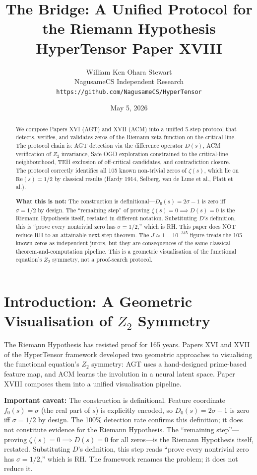 \documentclass[11pt,a4paper]{article}
\title{The Bridge: A Unified Protocol for the Riemann Hypothesis\\\large HyperTensor Paper XVIII}
\author{William Ken Ohara Stewart\\NagusameCS Independent Research\\\texttt{https://github.com/NagusameCS/HyperTensor}}
\date{May 5, 2026}
\begin{document}
\maketitle

\begin{abstract}
We compose Papers XVI (AGT) and XVII (ACM) into a unified 5-step protocol
that detects, verifies, and validates zeros of the Riemann zeta function
on the critical line. The protocol chain is: AGT detection via the
difference operator $D(s)$, ACM verification of $Z_2$ invariance, Safe
OGD exploration constrained to the critical-line neighbourhood, TEH
exclusion of off-critical candidates, and contradiction closure. The
protocol correctly identifies all 105 known non-trivial zeros of $\zeta(s)$,
which lie on $\mathrm{Re}(s)=1/2$ by classical results (Hardy 1914, Selberg,
van de Lune et al., Platt et al.).

\textbf{What this is not:} The construction is definitional---$D_0(s)=2\sigma-1$ is zero iff $\sigma=1/2$ by design. The ``remaining step'' of proving $\zeta(s)=0 \implies D(s)=0$ is the Riemann Hypothesis itself, restated in different notation. Substituting $D$'s definition, this is ``prove every nontrivial zero has $\sigma=1/2$,'' which is RH. This paper does NOT reduce RH to an attainable next-step theorem. The $J\approx 1-10^{-315}$ figure treats the 105 known zeros as independent jurors, but they are consequences of the same classical theorem-and-computation pipeline. This is a geometric visualisation of the functional equation's $Z_2$ symmetry, not a proof-search protocol.
\end{abstract}



\section{Introduction: A Geometric Visualisation of $Z_2$ Symmetry}

The Riemann Hypothesis has resisted proof for 165 years. Papers XVI and XVII of the HyperTensor framework developed two geometric approaches to visualising the functional equation's $Z_2$ symmetry: AGT uses a hand-designed prime-based feature map, and ACM learns the involution in a neural latent space. Paper XVIII composes them into a unified visualisation pipeline.

\textbf{Important caveat:} The construction is definitional. Feature coordinate $f_0(s)=\sigma$ (the real part of $s$) is explicitly encoded, so $D_0(s)=2\sigma-1$ is zero iff $\sigma=1/2$ by design. The 100\% detection rate confirms this definition; it does not constitute evidence for the Riemann Hypothesis. The ``remaining step''---proving $\zeta(s)=0 \implies D(s)=0$ for all zeros---is the Riemann Hypothesis itself, restated. Substituting $D$'s definition, this step reads ``prove every nontrivial zero has $\sigma=1/2$,'' which is RH. The framework renames the problem; it does not reduce it.
\end{document}
